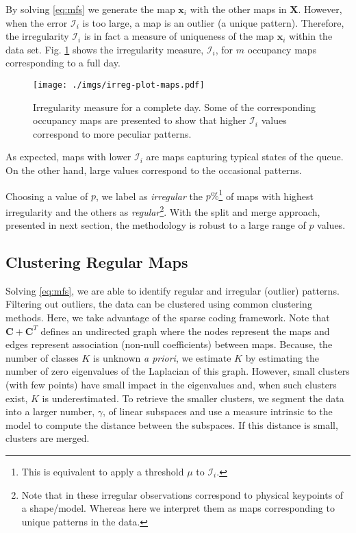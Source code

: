 By solving \eqref{eq:mfs} we generate the map $\mathbf{x}_i$ with the other maps in $\mathbf{X}$. 
However, when the error $\mathcal{I}_i$ is too large, a map is an outlier (a unique pattern). 
Therefore, the irregularity $\mathcal{I}_i$ is in fact a measure of uniqueness of the map $\mathbf{x}_i$ within the data set. 
Fig. \ref{fig:irreg} shows the irregularity measure, $\mathcal{I}_i$, for $m$ occupancy maps corresponding to a full day.
\begin{figure}[tbh]
\centering
\texttt{[image: ./imgs/irreg-plot-maps.pdf]}
\caption{Irregularity measure for a complete day. Some of the corresponding occupancy maps are presented to show that higher $\mathcal{I}_i$ values correspond to more peculiar patterns.}
\label{fig:irreg}
\end{figure}
As expected, maps with lower $\mathcal{I}_i$ are maps capturing typical states of the queue. 
On the other hand, large values correspond to the occasional patterns.

Choosing a value of $p$, we label as \emph{irregular} the $p\%$\footnote{This is equivalent to apply a threshold $\mu$ to $\mathcal{I}_i$\cite{oat2016mfs}.} of maps with highest irregularity and the others as \emph{regular}\footnote{Note that in \cite{oat2016mfs} these irregular observations correspond to physical keypoints of a shape/model. 
Whereas here we interpret them as maps corresponding to unique patterns in the data. }. With the split and merge approach, presented in next section, the methodology is robust to a large range of $p$ values.

\subsection{Clustering Regular Maps}
\label{sec:clustering}
%
Solving \eqref{eq:mfs}, we are able to identify regular and irregular (outlier) patterns. Filtering out outliers, the data can be clustered using common clustering methods. Here, we take advantage of the sparse coding framework.
Note that $\mathbf{C} + \mathbf{C}^T$ defines an undirected graph where the nodes represent the maps and edges represent association (non-null coefficients) between maps.
Because, the number of classes $K$ is unknown \emph{a priori}, we estimate $K$ by estimating the number of zero eigenvalues of the Laplacian of this graph.
However, small clusters (with few points) have small impact in the eigenvalues and, when such clusters exist, $K$ is underestimated. 
To retrieve the smaller clusters, we segment the data into a larger number, $\gamma$, of linear subspaces and use a measure intrinsic to the model to compute the distance between the subspaces. If this distance is small, clusters are merged.

